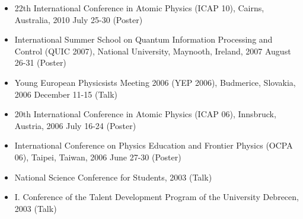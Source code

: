 
\begin{itemize}
  \item 22th International Conference in Atomic Physics (ICAP 10), Cairns, Australia, 2010 July 25-30 (Poster)
  \item International Summer School on Quantum Information Processing and Control (QUIC 2007), National University, Maynooth, Ireland, 2007 August 26-31 (Poster)
  \item Young European Physicsists Meeting 2006 (YEP 2006), Budmerice, Slovakia, 2006 December 11-15 (Talk)
  \item 20th International Conference in Atomic Physics (ICAP 06), Innsbruck, Austria, 2006 July 16-24 (Poster)
  \item International Conference on Physics Education and Frontier Physics (OCPA 06), Taipei, Taiwan, 2006 June 27-30 (Poster)
  \item National Science Conference for Students, 2003 (Talk)
  \item I. Conference of the Talent Development Program of the University Debrecen, 2003 (Talk)
\end{itemize}
